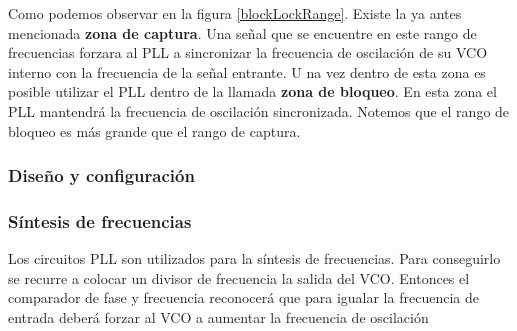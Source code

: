 Como podemos observar en la figura \ref{blockLockRange}. Existe la ya antes mencionada \textbf{zona de captura}. Una señal que se encuentre en este rango de frecuencias forzara al PLL a sincronizar la frecuencia de oscilación de su VCO interno con la frecuencia de la señal entrante. U na vez dentro de esta zona es posible utilizar el PLL dentro de la llamada \textbf{zona de bloqueo}. En esta zona el PLL mantendrá la frecuencia de oscilación sincronizada. Notemos que el rango de bloqueo es más grande que el rango de captura.

\subsubsection{Diseño y configuración}



\subsubsection{Síntesis de frecuencias}
Los circuitos PLL son utilizados para la síntesis de frecuencias. Para conseguirlo se recurre a colocar un divisor de frecuencia  la salida del VCO. Entonces el comparador de fase y frecuencia reconocerá que para igualar la frecuencia de entrada deberá forzar al VCO a aumentar la frecuencia de oscilación




%

